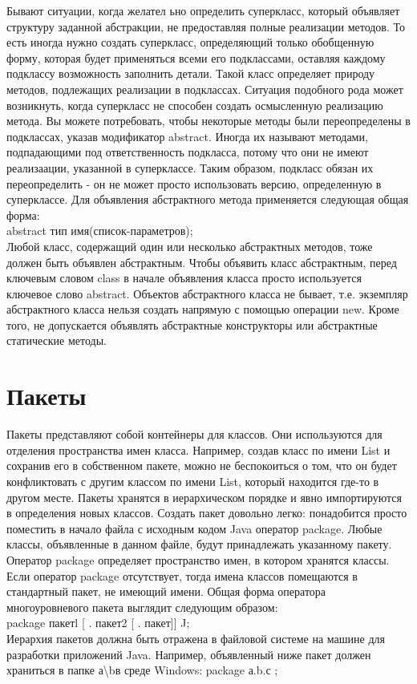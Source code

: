 \noindent Бывают ситуации, когда желател ьно определить суперкласс, который объявляет структуру заданной абстракции, не предоставляя полные реализации методов. То есть иногда нужно создать суперкласс, определяющий только обобщенную форму, которая будет применяться всеми его подклассами, оставляя каждому подклассу возможность заполнить детали. Такой класс определяет природу методов, подлежащих реализации в подклассах. Ситуация подобного рода может возникнуть, когда суперкласс не способен создать осмысленную реализацию метода. Вы можете потребовать, чтобы некоторые методы были переопределены в подклассах, указав модификатор abstract. Иногда их называют методами, подпадающими под ответственность подкласса, потому что они не имеют реализаации, указанной в суперклассе. Таким образом, подкласс обязан их переопределить - он не может просто использовать версию, определенную в суперклассе. Для объявления абстрактного метода применяется следующая общая форма: \\
abstract тип имя(список-параметров); \\
Любой класс, содержащий один или несколько абстрактных методов, тоже должен быть объявлен абстрактным. Чтобы объявить класс абстрактным, перед ключевым словом class в начале объявления класса просто используется ключевое слово abstract. Объектов абстрактного класса не бывает, т.е. экземпляр абстрактного класса нельзя создать напрямую с помощью операции new. Кроме того, не допускается объявлять абстрактные конструкторы или абстрактные статические методы.
\section{Пакеты}
Пакеты представляют собой контейнеры для классов. Они используются для отделения пространства имен класса. Например, создав класс по имени List и сохранив его в собственном пакете, можно не беспокоиться о том, что он будет конфликтовать с другим классом по имени List, который находится где-то в другом месте. Пакеты хранятся в иерархическом порядке и явно импортируются в определения новых классов. Создать пакет довольно легко: понадобится просто поместить в начало файла с исходным кодом Java оператор package. Любые классы, объявленные в данном файле, будут принадлежать указанному пакету. Оператор package определяет пространство имен, в котором хранятся классы. Если оператор package отсутствует, тогда имена классов помещаются в стандартный пакет, не имеющий имени. Общая форма оператора многоуровневого пакета выглядит следующим образом: \\
package пакетl [ . пакет2 [ . пакет]] J; \\
Иерархия пакетов должна быть отражена в файловой системе на машине для разработки приложений Java. Например, объявленный ниже пакет должен храниться в папке а\textbackslash b в среде Windows: package а.b.с ;
